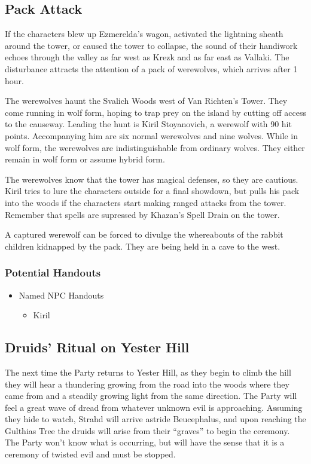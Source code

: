 \documentclass[a4paper,11pt]{article}
\begin{document}
\subsection{Pack Attack}
If the characters blew up Ezmerelda's wagon, activated the lightning sheath around the tower, or caused the tower 
to collapse, the sound of their handiwork echoes through the valley as far west as Krezk and as far east as 
Vallaki. The disturbance attracts the attention of a pack of werewolves, which arrives after 1 hour.

The werewolves haunt the Svalich Woods west of Van Richten's Tower. They come running in wolf form, hoping to trap 
prey on the island by cutting off access to the causeway. Leading the hunt is Kiril Stoyanovich, a werewolf with 90 
hit points. Accompanying him are six normal werewolves and nine wolves. While in wolf form, the werewolves are 
indistinguishable from ordinary wolves. They either remain in wolf form or assume hybrid form.

The werewolves know that the tower has magical defenses, so they are cautious. Kiril tries to lure the characters 
outside for a final showdown, but pulls his pack into the woods if the characters start making ranged attacks from 
the tower. Remember that spells are supressed by Khazan's Spell Drain on the tower.

A captured werewolf can be forced to divulge the whereabouts of the rabbit children kidnapped by the pack. They are 
being held in a cave to the west.
\subsubsection{Potential Handouts}
\begin{itemize}
  \item Named NPC Handouts
  \begin{itemize}
    \item Kiril
  \end{itemize}
\end{itemize}

\subsection{Druids' Ritual on Yester Hill}
The next time the Party returns to Yester Hill, as they begin to climb the hill they will hear a thundering 
growing from the road into the woods where they came from and a steadily growing light from the same direction. 
The Party will feel a great wave of dread from whatever unknown evil is approaching. Assuming they hide to watch, 
Strahd will arrive astride Beucephalus, and upon reaching the Gulthias Tree the druids will arise from their 
``graves'' to begin the ceremony. The Party won't know what is occurring, but will have the sense that it is a 
ceremony of twisted evil and must be stopped.
\end{document}

